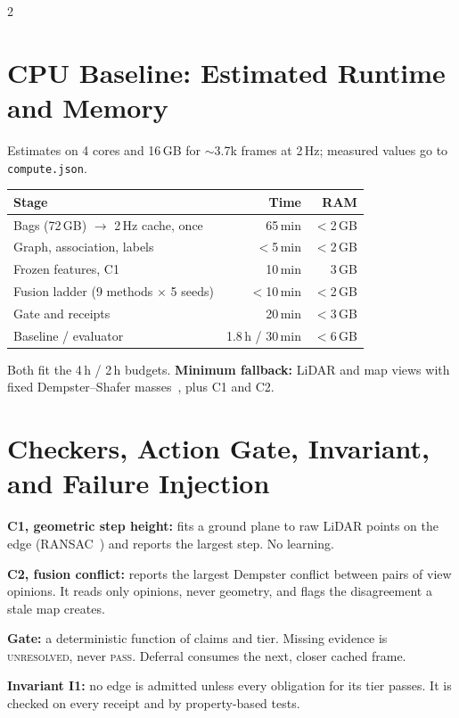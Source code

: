 \documentclass[10pt]{article}
\newcommand{\cl}[1]{\texttt{#1}}
\begin{document}
\begin{multicols*}{2}
\section{CPU Baseline: Estimated Runtime and Memory}

Estimates on 4 cores and 16\,GB for $\sim$3.7k frames at 2\,Hz; measured values go to \cl{compute.json}.

\begin{center}
	\footnotesize
	\begin{tabular}{@{}lrr@{}}
		\hline
		\textbf{Stage} & \textbf{Time} & \textbf{RAM} \\
		\hline
		Bags (72\,GB) $\to$ 2\,Hz cache, once & 65\,min & $<$2\,GB \\
		Graph, association, labels & $<$5\,min & $<$2\,GB \\
		Frozen features, C1 & 10\,min & 3\,GB \\
		Fusion ladder (9 methods $\times$ 5 seeds) & $<$10\,min & $<$2\,GB \\
		Gate and receipts & 20\,min & $<$3\,GB \\
		\hline
		Baseline / evaluator & 1.8\,h / 30\,min & $<$6\,GB \\
		\hline
	\end{tabular}
\end{center}

Both fit the 4\,h / 2\,h budgets. \textbf{Minimum fallback:} LiDAR and map views with fixed
Dempster--Shafer masses~\cite{valente2018}, plus C1 and C2.

\section{Checkers, Action Gate, Invariant, and Failure Injection}

\textbf{C1, geometric step height:} fits a ground plane to raw LiDAR points on the edge
(RANSAC~\cite{ransac1981}) and reports the largest step. No learning.

\textbf{C2, fusion conflict:} reports the largest Dempster conflict between pairs of view opinions.
It reads only opinions, never geometry, and flags the disagreement a stale map creates.

\textbf{Gate:} a deterministic function of claims and tier. Missing evidence is \textsc{unresolved},
never \textsc{pass}. Deferral consumes the next, closer cached frame.

\textbf{Invariant I1:} no edge is admitted unless every obligation for its tier passes. It is checked on
every receipt and by property-based tests.


\end{multicols*}
\end{document}
